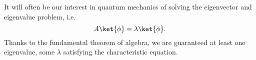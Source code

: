 It will often be our interest in quantum mechanics of solving the eigenvector and eigenvalue problem, i.e.
\begin{equation}
	A \ket{\phi} = \lambda \ket{\phi}.
\end{equation}
Thanks to the fundamental theorem of algebra, we are guaranteed at least one eigenvalue, some $\lambda$ satisfying the characteristic equation.